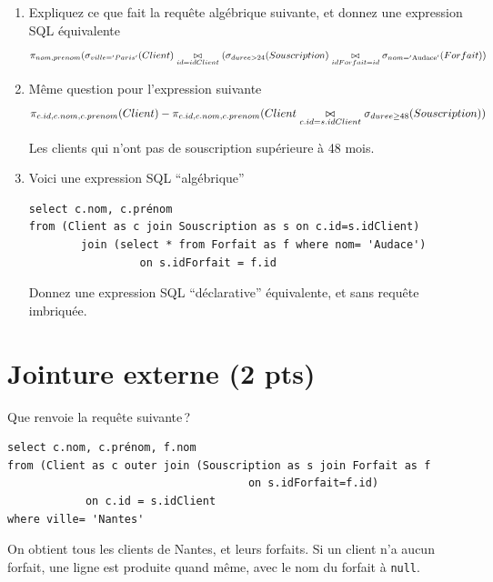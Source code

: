 \begin{enumerate}
\item Expliquez ce que fait la requête algébrique suivante, et donnez une expression SQL équivalente
	$$\pi_{nom, prenom}(\sigma_{ville='Paris'}(Client) \underset{id=idClient}{\bowtie} (\sigma_{duree > 24}(Souscription) \underset{idForfait=id}{\bowtie} \sigma_{nom='\rm{Audace}'} (Forfait))$$


\item Même question pour l'expression suivante
	$$\pi_{c.id, c.nom, c.prenom} (Client) - \pi_{c.id, c.nom, c.prenom} (Client \underset{c.id=s.idClient}{\bowtie}\\ \sigma_{duree \geq 48} (Souscription))$$


\begin{solution}
Les clients qui n'ont pas de souscription supérieure à 48 mois.
\end{solution}

\item Voici une expression SQL ``algébrique''
\begin{verbatim}
select c.nom, c.prénom
from (Client as c join Souscription as s on c.id=s.idClient)
        join (select * from Forfait as f where nom= 'Audace')
                 on s.idForfait = f.id
\end{verbatim}

Donnez une expression SQL ``déclarative'' équivalente, et sans requête imbriquée.

\end{enumerate}

\section{Jointure externe (2 pts)}

Que renvoie la requête suivante\,?
\begin{verbatim}
select c.nom, c.prénom, f.nom
from (Client as c outer join (Souscription as s join Forfait as f
                                     on s.idForfait=f.id)
            on c.id = s.idClient
where ville= 'Nantes'
\end{verbatim}


\begin{solution}
On obtient tous les clients de Nantes, et leurs forfaits. Si un client n'a aucun forfait, une ligne
est produite quand même, avec le nom du forfait à \texttt{null}.
\end{solution}
